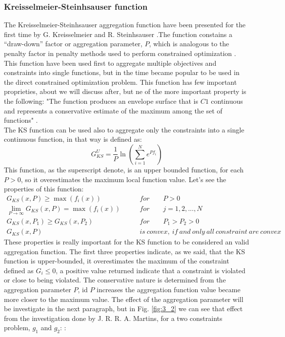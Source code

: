 \subsubsection{Kreisselmeier-Steinhsauser function}
The Kreisselmeier-Steinhsauser aggregation function have been presented for the first time by G. Kreisselmeier and R. Steinhsauser \cite{krei}.The function constains a “draw-down” factor or aggregation parameter, $P$, which is analogous to the penalty factor in penalty methods used to perform constrained optimization \cite{poon2}.\\
This function have been used first to aggregate multiple objectives and constraints into single functions, but in the time became popular to be used in the direct constrained optimization problem. This function has few important proprieties, about we will discuss after, but ne of the more important property is the following: "The function produces an envelope surface that is $C1$ continuous and represents a conservative estimate of the maximum among the set of functions" \cite{nasa}.\\
The KS function can be used also to aggregate only the constraints into a single continuous function, in that way is defined as:
\begin{equation}
G_{KS}^U=\frac{1}{P}\ln\left(\sum_{i=1}^{N}e^{Pf_i}\right)
\end{equation}
This function, as the superscript denote, is an upper bounded function, for each $P>0$, so it overestimates the maximum local function value. Let's see the properties of this function:
\begin{align*}
G_{KS}(x,P)\ge\max(f_i(x))                     &\qquad for \qquad P>0\\
\lim_{P\to\infty}G_{KS}(x,P)=\max(f_i(x))& \qquad for \qquad j=1,2,...,N\\
G_{KS}(x,P_1)\ge G_{KS}(x,P_2)             &\qquad for\qquad  P_1>P_2>0\\
G_{KS}(x,P) \qquad\qquad                     &\qquad is\ convex,\  if\  and\  only\  all\  constraint\  are\  convex
\end{align*}
These properties is really important for the KS function to be considered an valid aggregation function. The first three properties indicate, as we said, that the KS function is upper-bounded, it overestimates the maximum of the constraint defined as $G_i\le0$, a positive value returned indicate that a constraint is violated or close to being violated. The conservative nature is determined from the aggregation parameter $P$, id $P$ increases the aggregation function value became more closer to the maximum value. The effect of the aggregation parameter will be investigate in the next paragraph, but in Fig. \ref{fig:3_2} we can see that effect from the investigation done by J. R. R. A. Martins, for a two constraints problem, $g_1$ and $g_2$: \cite{poon2}:
